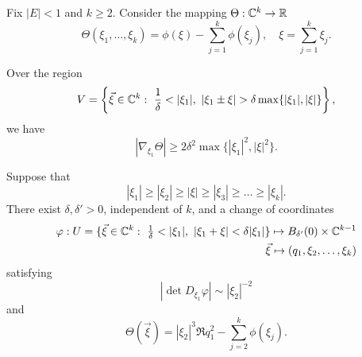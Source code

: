\begin{lemma}\label{lem:prop_resonance}
Fix $|E|<1$ and $k\ge 2$. Consider the mapping $\Theta:\mathbb{C}^{k}\to \mathbb{R}$
$$
\Theta(\xi_1,\dots, \xi_{k})= \phi(\xi)-\sum_{j=1}^k \phi(\xi_j),\quad \xi=\sum_{j=1}^{k} \xi_j.
$$

 Over the region
\begin{equation}
V=\left\{\vec{\xi}\in \CC^{k} :\  \frac{1}{\delta}<|\xi_1|,\  |\xi_1\pm\xi|>\delta\max\{|\xi_1|, |\xi|\}\right\},
\end{equation}
we have
$$
|\nabla_{\xi_1}\Theta|\ge 2\delta^2\max\{|\xi_1|^2, |\xi|^2\}.
$$

 Suppose that
$$
|\xi_1|\ge |\xi_2| \ge |\xi|\ge |\xi_3|\ge \dots \ge |\xi_k|.
$$
There exist $\delta, \delta'>0$, independent of $k$, and a change of coordinates
\begin{align*}
\varphi:U=\{\vec{\xi}\in \CC^{k} :\  \tfrac{1}{\delta}<|\xi_1|,\  |\xi_1+\xi|<\delta|\xi_1|\} \mapsto B_{\delta'}(0)\times \CC^{k-1}\\ \vec{\xi}\mapsto (q_1, \xi_2, \dots, \xi_k)
\end{align*}
satisfying
\begin{equation}\label{eq:nondeg}
|\det D_{\xi_1}\varphi| \sim |\xi_2|^{-2}
\end{equation}
and
$$
\Theta(\vec{\xi})=|\xi_2|^3\Re q_1^2 - \sum_{j=2}^k \phi(\xi_j).
$$

\end{lemma}
